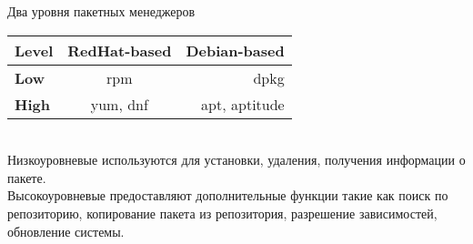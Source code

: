 \begin{frame}{Два уровня пакетных менеджеров}

\begin{tabular}{| l | c | r |}
      \hline
          Level &  RedHat-based & Debian-based \\ 
      \hline
          {\bf Low} & rpm & dpkg \\ 
      \hline
          {\bf High} & yum, dnf & apt, aptitude \\
      \hline
    \end{tabular}
    \\


    \alert{Низкоуровневые} используются для установки, удаления, получения информации о пакете. \\
    \alert{Высокоуровневые} предоставляют дополнительные функции такие как поиск по репозиторию, копирование пакета из репозитория, разрешение зависимостей, обновление системы.

\end{frame}
